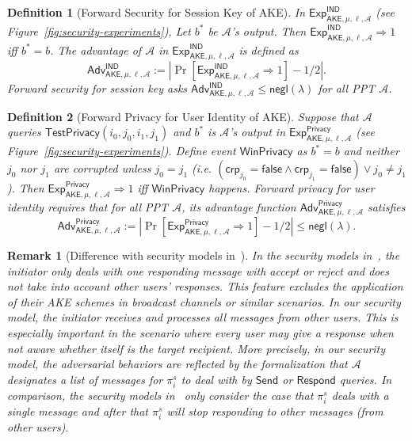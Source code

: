 \documentclass[a4paper,11pt]{article}
\newtheorem{defn}{Definition}[]
\newtheorem{rmk}{Remark}[]
\begin{document}
\begin{sloppypar}
\begin{defn}[Forward Security for Session Key of AKE]
In $\mathsf{Exp}^{\mathsf{IND}}_{\mathsf{AKE},\mu,\ell,\mathcal{A}}$ (see Figure~\ref{fig:security-experiments}), Let $b^*$ be $\mathcal{A}$'s output. Then $\mathsf{Exp}^{\mathsf{IND}}_{\mathsf{AKE},\mu,\ell,\mathcal{A}} \Rightarrow 1$ iff $b^* = b$. The advantage of $\mathcal{A}$ in $\mathsf{Exp}^{\mathsf{IND}}_{\mathsf{AKE},\mu,\ell,\mathcal{A}}$ is defined as
\[
\mathsf{Adv}^{\mathsf{IND}}_{\mathsf{AKE},\mu,\ell,\mathcal{A}} := \left|\Pr\left[\mathsf{Exp}^{\mathsf{IND}}_{\mathsf{AKE},\mu,\ell,\mathcal{A}} \Rightarrow 1\right] - 1/2\right|.
\]
Forward security for session key asks $\mathsf{Adv}^{\mathsf{IND}}_{\mathsf{AKE},\mu,\ell,\mathcal{A}} \leq \mathsf{negl}(\lambda)$ for all PPT $\mathcal{A}$.
\end{defn}

\begin{defn}[Forward Privacy for User Identity of AKE]
Suppose that $\mathcal{A}$ queries $\mathsf{TestPrivacy}(i_0, j_0, i_1, j_1)$ and $b^*$ is $\mathcal{A}$'s output in $\mathsf{Exp}^{\mathsf{Privacy}}_{\mathsf{AKE},\mu,\ell,\mathcal{A}}$ (see Figure~\ref{fig:security-experiments}). Define event $\mathsf{WinPrivacy}$ as $b^* = b$ and neither $j_0$ nor $j_1$ are corrupted unless $j_0 = j_1$ (i.e. $(\mathsf{crp}_{j_0} = \mathsf{false} \land \mathsf{crp}_{j_1} = \mathsf{false}) \lor j_0 \neq j_1$). Then $\mathsf{Exp}^{\mathsf{Privacy}}_{\mathsf{AKE},\mu,\ell,\mathcal{A}} \Rightarrow 1$ iff $\mathsf{WinPrivacy}$ happens. Forward privacy for user identity requires that for all PPT $\mathcal{A}$, its advantage function $\mathsf{Adv}^{\mathsf{Privacy}}_{\mathsf{AKE},\mu,\ell,\mathcal{A}}$ satisfies
\[
\mathsf{Adv}^{\mathsf{Privacy}}_{\mathsf{AKE},\mu,\ell,\mathcal{A}} := \left|\Pr\left[\mathsf{Exp}^{\mathsf{Privacy}}_{\mathsf{AKE},\mu,\ell,\mathcal{A}} \Rightarrow 1\right] - 1/2\right| \leq \mathsf{negl}(\lambda).
\]
\end{defn}

\begin{rmk}[Difference with security models in~\cite{SSL20,RSW19}]
In the security models in~\cite{SSL20,RSW19}, the initiator only deals with one responding message with accept or reject and does not take into account other users' responses. This feature excludes the application of their AKE schemes in broadcast channels or similar scenarios. In our security model, the initiator receives and processes all messages from other users. This is especially important in the scenario where every user may give a response when not aware whether itself is the target recipient. More precisely, in our security model, the adversarial behaviors are reflected by the formalization that $\mathcal{A}$ designates a list of messages for $\pi^s_i$ to deal with by $\mathsf{Send}$ or $\mathsf{Respond}$ queries. In comparison, the security models in~\cite{SSL20,RSW19} only consider the case that $\pi^s_i$ deals with a single message and after that $\pi^s_i$ will stop responding to other messages (from other users).
\end{rmk}


\end{sloppypar}
\end{document}
